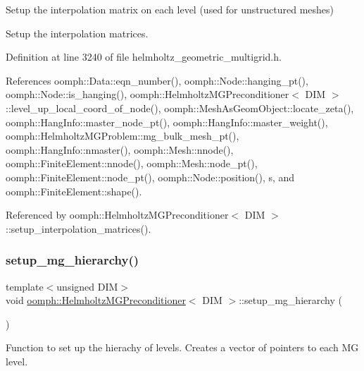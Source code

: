 Setup the interpolation matrix on each level (used for unstructured meshes) 

Setup the interpolation matrices. 

Definition at line 3240 of file helmholtz\+\_\+geometric\+\_\+multigrid.\+h.



References oomph\+::\+Data\+::eqn\+\_\+number(), oomph\+::\+Node\+::hanging\+\_\+pt(), oomph\+::\+Node\+::is\+\_\+hanging(), oomph\+::\+Helmholtz\+M\+G\+Preconditioner$<$ D\+I\+M $>$\+::level\+\_\+up\+\_\+local\+\_\+coord\+\_\+of\+\_\+node(), oomph\+::\+Mesh\+As\+Geom\+Object\+::locate\+\_\+zeta(), oomph\+::\+Hang\+Info\+::master\+\_\+node\+\_\+pt(), oomph\+::\+Hang\+Info\+::master\+\_\+weight(), oomph\+::\+Helmholtz\+M\+G\+Problem\+::mg\+\_\+bulk\+\_\+mesh\+\_\+pt(), oomph\+::\+Hang\+Info\+::nmaster(), oomph\+::\+Mesh\+::nnode(), oomph\+::\+Finite\+Element\+::nnode(), oomph\+::\+Mesh\+::node\+\_\+pt(), oomph\+::\+Finite\+Element\+::node\+\_\+pt(), oomph\+::\+Node\+::position(), s, and oomph\+::\+Finite\+Element\+::shape().



Referenced by oomph\+::\+Helmholtz\+M\+G\+Preconditioner$<$ D\+I\+M $>$\+::setup\+\_\+interpolation\+\_\+matrices().

\mbox{\label{classoomph_1_1HelmholtzMGPreconditioner_ad811c870bf06b25f3237c84b5037e089}} 
\subsubsection{\texorpdfstring{setup\+\_\+mg\+\_\+hierarchy()}{setup\_mg\_hierarchy()}}
{\footnotesize\ttfamily template$<$unsigned D\+IM$>$ \\
void \hyperlink{classoomph_1_1HelmholtzMGPreconditioner}{oomph\+::\+Helmholtz\+M\+G\+Preconditioner}$<$ D\+IM $>$\+::setup\+\_\+mg\+\_\+hierarchy (\begin{DoxyParamCaption}{ }\end{DoxyParamCaption})\hspace{0.3cm}{\ttfamily [private]}}



Function to set up the hierachy of levels. Creates a vector of pointers to each MG level. 

